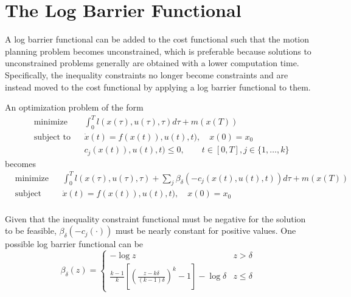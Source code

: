 \section{The Log Barrier Functional}
\label{sec:logbarrierfunc}

\par A log barrier functional can be added to the cost functional such that the motion planning problem becomes unconstrained, which is preferable because solutions to unconstrained problems generally are obtained with a lower computation time. Specifically, the inequality constraints no longer become constraints and are instead moved to the cost functional by applying a log barrier functional to them.
\par An optimization problem of the form 
\begin{equation}
    \label{eq:opt_prob_without_log_bar}
    \begin{aligned}
    & \text{minimize} && \int_0^T l(x(\tau),u(\tau),\tau)d\tau + m(x(T)) \\
    & \text{subject to}  && \dot{x}(t) = f(x(t)),u(t),t),\quad x(0)=x_0 \\
        & && c_j(x(t)),u(t),t)\leq 0, \qquad t\in [0,T],j\in \{1,\dots,k \}
    \end{aligned}
\end{equation}
becomes
\begin{equation}
    \label{eq:opt_prob_with_log_bar}
    \begin{aligned}
    & \text{minimize} && \int_0^T l(x(\tau),u(\tau),\tau)+\sum_j \beta_\delta(-c_j(x(t),u(t),t))d\tau + m(x(T)) \\
    & \text{subject to}  && \dot{x}(t) = f(x(t)),u(t),t),\quad x(0)=x_0 \\
    \end{aligned}
\end{equation}
\par Given that the inequality constraint functional must be negative for the solution to be feasible, $\beta_\delta(-c_j(\cdot))$ must be nearly constant for positive values. One possible log barrier functional can be
\begin{equation}
    \beta_\delta (z) = 
    \begin{cases}
        -\log{} z & z>\delta \\
        \frac{k-1}{k}\left[\left(\frac{z-k\delta}{(k-1)\delta}\right)^k-1\right]-\log{}\delta & z\leq \delta
    \end{cases}
\end{equation}
